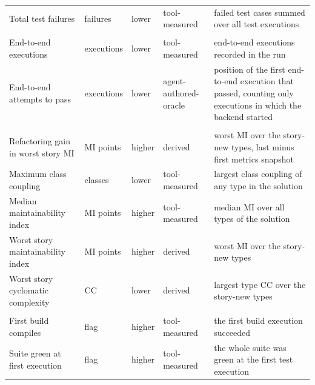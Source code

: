 \begin{tabular}{@{}p{}lllp{}@{}}
\raggedright Total test failures & failures & lower & tool-measured & {\raggedright failed test cases summed over all test executions\strut\par} \\
\addlinespace
\multicolumn{5}{@{}l}{\textbf{Behavioral (RQ3)}} \\
\raggedright End-to-end executions & executions & lower & tool-measured & {\raggedright end-to-end executions recorded in the run\strut\par} \\
\raggedright End-to-end attempts to pass & executions & lower & agent-authored-oracle & {\raggedright position of the first end-to-end execution that passed, counting only executions in which the backend started\strut\par} \\
\addlinespace
\multicolumn{5}{@{}l}{\textbf{Quality (RQ4)}} \\
\raggedright Refactoring gain in worst story MI & MI points & higher & derived & {\raggedright worst MI over the story-new types, last minus first metrics snapshot\strut\par} \\
\raggedright Maximum class coupling & classes & lower & tool-measured & {\raggedright largest class coupling of any type in the solution\strut\par} \\
\raggedright Median maintainability index & MI points & higher & tool-measured & {\raggedright median MI over all types of the solution\strut\par} \\
\raggedright Worst story maintainability index & MI points & higher & derived & {\raggedright worst MI over the story-new types\strut\par} \\
\raggedright Worst story cyclomatic complexity & CC & lower & derived & {\raggedright largest type CC over the story-new types\strut\par} \\
\addlinespace
\multicolumn{5}{@{}l}{\textbf{Reliability (RQ5)}} \\
\raggedright First build compiles & flag & higher & tool-measured & {\raggedright the first build execution succeeded\strut\par} \\
\raggedright Suite green at first execution & flag & higher & tool-measured & {\raggedright the whole suite was green at the first test execution\strut\par} \\

\end{tabular}
